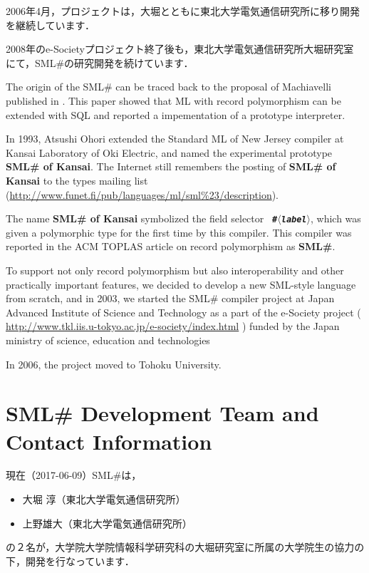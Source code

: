 \documentclass{jbook}
\newcommand{\txt}[2]{#2}
\newcommand{\smlsharp}{SML\#}
\newcommand{\releaseDate}{2017-06-09}
\newcommand{\nonterm}[1]{\mbox{$\langle$}{\it #1}\mbox{$\rangle$}}
\begin{document}
2006年4月，プロジェクトは，大堀とともに東北大学電気通信研究所に移り開発
を継続しています．

2008年のe-Societyプロジェクト終了後も，東北大学電気通信研究所大堀研究室
にて，\smlsharp{}の研究開発を続けています．

\else%
	The origin of the \smlsharp{} can be traced back to the proposal
of Machiavelli published in \cite{ohor89sigmod}.
	This paper showed that ML with record polymorphism can be
extended with SQL and reported a impementation of a prototype interpreter. 

	In 1993, Atsushi Ohori extended the Standard ML of New Jersey
compiler at Kansai Laboratory of Oki Electric, and named the
experimental prototype {\bf SML\# of Kansai}.
	The Internet still remembers the posting of {\bf SML\# of
Kansai} to the types mailing list  
(\url{http://www.funet.fi/pub/languages/ml/sml%23/description}).

	The name {\bf SML\# of Kansai} symbolized the field selector {\bf\tt
\#\nonterm{label}}, which was given a polymorphic type for the first
time by this compiler.
	This compiler was reported in the ACM TOPLAS article on record
polymorphism \cite{ohor95toplas} as {\bf \smlsharp{}}.

	To support not only record polymorphism but also
interoperability and other practically important features, we decided 
to develop a new SML-style language from scratch, and in 2003, we
started the \smlsharp{} compiler project at Japan Advanced Institute of 
Science and Technology as a part of the e-Society project 
(
\url{http://www.tkl.iis.u-tokyo.ac.jp/e-society/index.html}
)
funded by the Japan ministry of science, education and technologies

	In 2006, the project moved to Tohoku University.
\fi%

\section{
\txt{\smlsharp{}開発チームと連絡先情報}
{\smlsharp{} Development Team and Contact Information}
}
\label{sec:smlsharpTeam}

\ifjp%
	現在（\releaseDate）\smlsharp{}は，
\begin{itemize}
\item 
大堀 淳（東北大学電気通信研究所）
\item 
上野雄大（東北大学電気通信研究所）
\end{itemize}
の２名が，大学院大学院情報科学研究科の大堀研究室に所属の大学院生の協力の
下，開発を行なっています．
\end{document}

